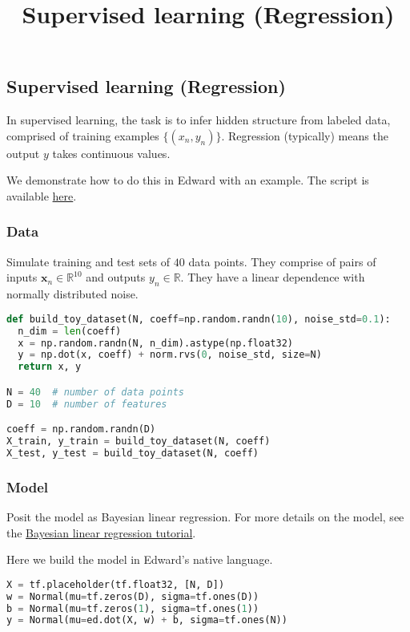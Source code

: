 \title{Supervised learning (Regression)}

\subsection{Supervised learning (Regression)}

In supervised learning, the task is to infer hidden structure from
labeled data, comprised of training examples $\{(x_n, y_n)\}$.
Regression (typically) means the output $y$ takes continuous values.

We demonstrate how to do this in Edward with an example.
The script is available
\href{https://github.com/blei-lab/edward/blob/master/examples/bayesian_linear_regression_10d.py}
{here}.


\subsubsection{Data}

Simulate training and test sets of $40$ data points. They comprise of
pairs of inputs $\mathbf{x}_n\in\mathbb{R}^{10}$ and outputs
$y_n\in\mathbb{R}$. They have a linear dependence with normally
distributed noise.

\begin{lstlisting}[language=Python]
def build_toy_dataset(N, coeff=np.random.randn(10), noise_std=0.1):
  n_dim = len(coeff)
  x = np.random.randn(N, n_dim).astype(np.float32)
  y = np.dot(x, coeff) + norm.rvs(0, noise_std, size=N)
  return x, y

N = 40  # number of data points
D = 10  # number of features

coeff = np.random.randn(D)
X_train, y_train = build_toy_dataset(N, coeff)
X_test, y_test = build_toy_dataset(N, coeff)
\end{lstlisting}


\subsubsection{Model}

Posit the model as Bayesian linear regression. For more details on the
model, see the
\href{/tutorials/bayesian-linear-regression}
{Bayesian linear regression tutorial}.

Here we build the model in Edward's native language.
\begin{lstlisting}[language=Python]
X = tf.placeholder(tf.float32, [N, D])
w = Normal(mu=tf.zeros(D), sigma=tf.ones(D))
b = Normal(mu=tf.zeros(1), sigma=tf.ones(1))
y = Normal(mu=ed.dot(X, w) + b, sigma=tf.ones(N))
\end{lstlisting}


